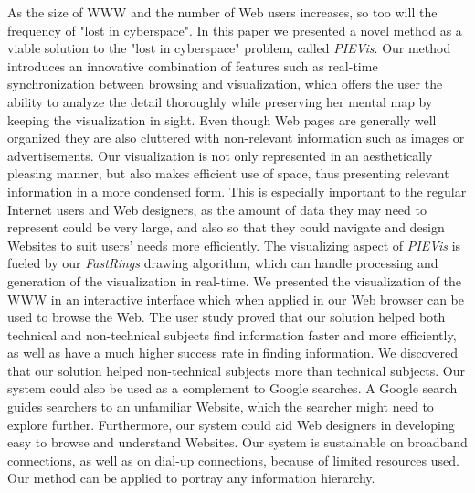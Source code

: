 \documentclass[]{article}
\begin{document}
{As the size of WWW and the number of Web users increases, so too will the frequency of "lost in cyberspace".
In this paper we presented a novel method as a viable solution to the "lost in cyberspace" problem, called {\em PIEVis}.
Our method introduces an innovative combination of features such as real-time synchronization between browsing and visualization, which offers the user the ability to analyze the detail thoroughly while preserving her mental map by keeping the visualization in sight.
Even though Web pages are generally well organized they are also cluttered with non-relevant information such as images or advertisements.
Our visualization is not only represented in an aesthetically pleasing manner, but also makes efficient use of space, thus presenting relevant information in a more condensed form.
This is especially important to the regular Internet users and Web designers, as the amount of data they may need to represent could be very large, and also so that they could navigate and design Websites to suit users' needs more efficiently.
The visualizing aspect of {\em PIEVis} is fueled by our {\em FastRings} drawing algorithm, which can handle processing and generation of the visualization in real-time.
We presented the visualization of the WWW in an interactive interface which when applied in our Web browser can be used to browse the Web.
The user study proved that our solution helped both technical and non-technical subjects find information faster and more efficiently, as well as have a much higher success rate in finding information.
We discovered that our solution helped non-technical subjects more than technical subjects.
Our system could also be used as a complement to Google searches. A Google search guides searchers to an unfamiliar Website, which the searcher might need to explore further.
Furthermore, our system could aid Web designers in developing easy to browse and understand Websites.   
Our system is sustainable on broadband connections, as well as on dial-up connections, because of limited resources used.
Our method can be applied to portray any information hierarchy.

}
\end{document}
